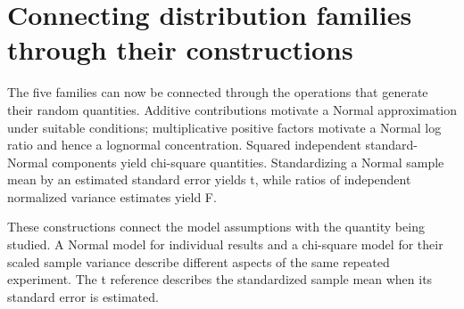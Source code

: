 \documentclass[11pt,a4paper]{article}
\begin{document}

\medskip

\clearpage
\section{Connecting distribution families through their constructions}
The five families can now be connected through the operations that generate their random quantities. Additive contributions motivate a Normal approximation under suitable conditions; multiplicative positive factors motivate a Normal log ratio and hence a lognormal concentration. Squared independent standard-Normal components yield chi-square quantities. Standardizing a Normal sample mean by an estimated standard error yields t, while ratios of independent normalized variance estimates yield F.


These constructions connect the model assumptions with the quantity being studied. A Normal model for individual results and a chi-square model for their scaled sample variance describe different aspects of the same repeated experiment. The t reference describes the standardized sample mean when its standard error is estimated.
\end{document}
